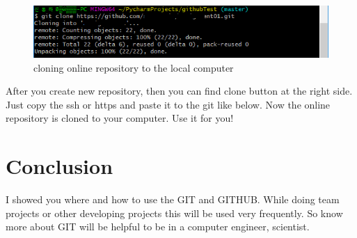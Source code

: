 \documentclass{article}
\begin{document}
\begin{figure}[h]
\centering
\includegraphics[scale=0.75]{clone.png}
\caption{cloning online repository to the local computer}
\label{fig:cloning online repository to the local computer}
\end{figure}
\newpage
After you create new repository, then you can find clone button at the right side.
Just copy the ssh or https and paste it to the git like below.
Now the online repository is cloned to your computer. Use it for you!
\section{Conclusion}
I showed you where and how to use the GIT and GITHUB. While doing team projects or other developing projects this will be used very frequently. So know more about GIT will be helpful to be in a computer engineer, scientist.
\end{document}
